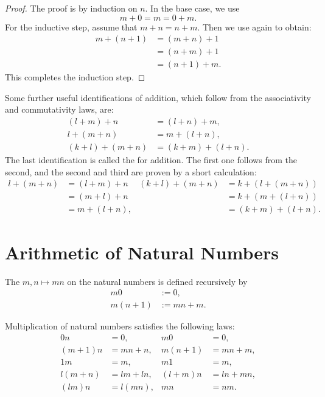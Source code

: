 \begin{proof}
  The proof is by induction on $n$. In the base case, we use 
  \begin{equation*}
    m+0=m=0+m.
  \end{equation*}
  For the inductive step, assume that $m+n=n+m$. Then we use  again to obtain:
  \begin{align*}
    m+(n+1) & = (m+n)+1 \\
            & = (n+m)+1 \\
            & = (n+1)+m.
  \end{align*}
  This completes the induction step.
\end{proof}

Some further useful identifications of addition, which follow from the associativity and commutativity laws, are:
\begin{align*}
  (l+m)+n & = (l+n)+m, \\
  l+(m+n) & = m+(l+n), \\
  (k+l)+(m+n) & = (k+m)+(l+n).
\end{align*}
The last identification is called the  for addition. The first one follows from the second, and the second and third are proven by a short calculation:
\begin{align*}
  l+(m+n) & = (l+m)+n & (k+l)+(m+n) & = k+(l+(m+n)) \\
          & = (m+l)+n & & = k + (m + (l+n)) \\
          & = m+(l+n), & & = (k+m)+(l+n).
\end{align*}

\section{Arithmetic of Natural Numbers}

\begin{definition}
  The  $m,n\mapsto mn$ on the natural numbers is defined recursively by
  \begin{align*}
    m0 & := 0, \\
    m(n+1) & := mn + m.
  \end{align*}
\end{definition}

\begin{proposition}
  Multiplication of natural numbers satisfies the following laws:
  \begin{align*}
    0n & = 0, & m0 & = 0, \\
    (m+1)n & = mn+n, & m(n+1) & = mn+m, \\
    1m & = m, & m1 & = m, \\
    l(m+n) & = lm+ln, & (l+m)n & = ln+mn, \\
    (lm)n & = l(mn), & mn & = nm.
  \end{align*}
\end{proposition}

